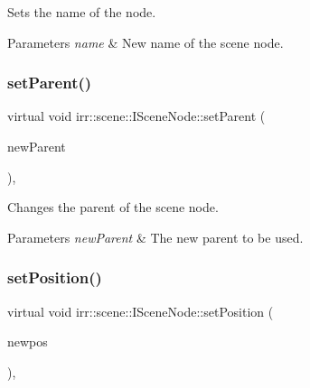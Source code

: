 Sets the name of the node. 


\begin{DoxyParams}{Parameters}
{\em name} & New name of the scene node. \\
\hline
\end{DoxyParams}
\mbox{\label{classirr_1_1scene_1_1ISceneNode_a59e7f36cb5c9c4895e06fce0ca5eb276}} 
\subsubsection{\texorpdfstring{set\+Parent()}{setParent()}}
{\footnotesize\ttfamily virtual void irr\+::scene\+::\+I\+Scene\+Node\+::set\+Parent (\begin{DoxyParamCaption}\item[{\hyperlink{classirr_1_1scene_1_1ISceneNode}{I\+Scene\+Node} $\ast$}]{new\+Parent }\end{DoxyParamCaption})\hspace{0.3cm}{\ttfamily [inline]}, {\ttfamily [virtual]}}



Changes the parent of the scene node. 


\begin{DoxyParams}{Parameters}
{\em new\+Parent} & The new parent to be used. \\
\hline
\end{DoxyParams}
\mbox{\label{classirr_1_1scene_1_1ISceneNode_a2166eb0a92cc0e46c49266f41a68ed50}} 
\subsubsection{\texorpdfstring{set\+Position()}{setPosition()}}
{\footnotesize\ttfamily virtual void irr\+::scene\+::\+I\+Scene\+Node\+::set\+Position (\begin{DoxyParamCaption}\item[{const \hyperlink{namespaceirr_1_1core_a06f169d08b5c429f5575acb7edbad811}{core\+::vector3df} \&}]{newpos }\end{DoxyParamCaption})\hspace{0.3cm}{\ttfamily [inline]}, {\ttfamily [virtual]}}



